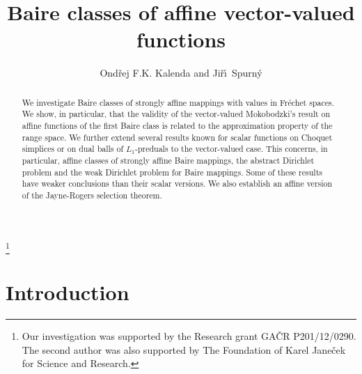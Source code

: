 \documentclass{amsart}
\numberwithin{equation}{section}
\theoremstyle{definition}
\begin{document}
\title{Baire classes of affine vector-valued functions}

\author{Ond\v{r}ej F.K. Kalenda and Ji\v r\'\i\ Spurn\'y}

\address{ Charles University in Prague\\
Faculty of Mathematics and Physics\\Department of Mathematical Analysis \\
Sokolovsk\'{a} 83, 186 \ 75\\Praha 8, Czech Republic}



\thanks{Our investigation was supported by the Research grant GA\v{C}R P201/12/0290. The second author was also
supported by The Foundation of Karel Jane\v{c}ek for Science and Research.}

\begin{abstract}
We investigate Baire classes of strongly affine mappings with values in Fr\'echet spaces.  We show, in particular, that the validity of the vector-valued Mokobodzki's result on affine functions of the first Baire class is related to the approximation property of the range space. We further extend several results known for scalar functions on Choquet simplices or on dual balls of $L_1$-preduals to the vector-valued case. This concerns, in particular, affine classes of strongly affine Baire mappings, the abstract Dirichlet problem and the weak Dirichlet problem for Baire mappings. Some of these results have weaker conclusions than their scalar versions. We also establish an affine version of the Jayne-Rogers selection theorem.
\end{abstract}

\maketitle




\section{Introduction}
\end{document}
